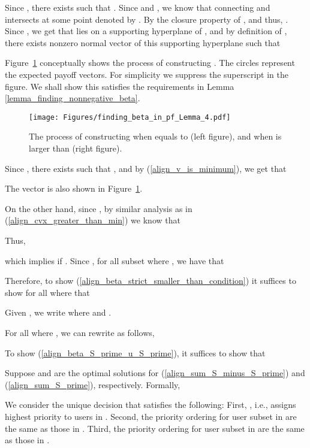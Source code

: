 \documentclass[prodmode,acmtompecs]{acmsmall}
\begin{document}
Since , there exists  such that . Since  and , we know that connecting  and  intersects  at some point denoted by . By the closure property of ,  and thus, . 
Since , we get that  lies on a supporting hyperplane \cite{BoV09} of , and by definition of , there exists nonzero normal vector  of this supporting hyperplane such that


Figure~\ref{fig_finding_beta_in_pf_Lemma_4} conceptually shows the process of constructing . The circles represent the expected payoff vectors. For simplicity we suppress the superscript  in the figure. 
We shall show this  satisfies the requirements in Lemma \ref{lemma_finding_nonnegative_beta}. 

\begin{figure}[htp]
  \centering
  \texttt{[image: Figures/finding\_beta\_in\_pf\_Lemma\_4.pdf]}
  \caption{The process of constructing  when  equals to  (left figure), and when  is larger than  (right figure). }
  \label{fig_finding_beta_in_pf_Lemma_4}
\end{figure}

Since , there exists  such that , and by (\ref{align_v_is_minimum}), we get that

The vector  is also shown in Figure{~\ref{fig_finding_beta_in_pf_Lemma_4}}. 

On the other hand, since , by similar analysis as in (\ref{align_cvx_greater_than_min}) we know that


Thus, 

which implies  if . Since , for all subset  where , we have that


Therefore, to show (\ref{align_beta_strict_smaller_than_condition}) it suffices to show for all  where  that


Given , we write  where  and . 

For all  where , we can rewrite  as follows,


To show (\ref{align_beta_S_prime_u_S_prime}), it suffices to show that


Suppose  and  are the optimal solutions for (\ref{align_sum_S_minus_S_prime}) and (\ref{align_sum_S_prime}), respectively. Formally, 



We consider the unique decision  that satisfies the following: 
First, , i.e.,  assigns highest priority to users in . 
Second, the priority ordering for user subset  in  are the same as those in . 
Third, the priority ordering for user subset  in  are the same as those in . 
\end{document}
